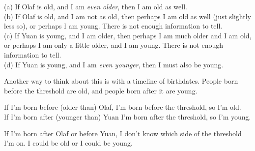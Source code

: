 \begin{solution}
(a) If Olaf is old, and I am \emph{even older}, then I am old as well.\\
(b) If Olaf is old, and I am {not as old}, then perhaps I am old as well (just slightly less so), or perhaps I am young. There is not enough information to tell.\\
(c) If Yuan is young, and I am older, then perhaps I am much older and I am old, or perhaps I am only a little older, and I am young. There is not enough information to tell.\\
(d) If Yuan is young, and I am \emph{even younger}, then I must also be young.

Another way to think about this is with a timeline of birthdates. People born before the threshold are old, and people born after it are young.
\begin{center}\end{center}

If I'm born before (older than) Olaf, I'm born before the threshold, so I'm old.\\
If I'm born after (younger than) Yuan I'm born after the threshold, so I'm young.
\begin{center}\end{center}
If I'm born after Olaf or before Yuan, I don't know which side of the threshold I'm on. I could be old or I could be young.
\begin{center}\end{center}
\end{solution}

